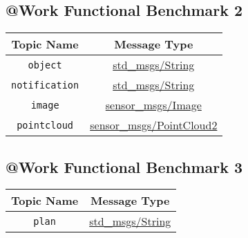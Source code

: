 \documentclass[a4paper]{article}
\begin{document}
\subsection{@Work Functional Benchmark 2}
\begin{center}
\begin{tabular}{|c|c|}\hline
Topic Name & Message Type \\\hline\hline
\verb!object! & \href{http://docs.ros.org/api/std\_msgs/html/msg/String.html}{std\_msgs/String} \\\hline
\verb!notification! & \href{http://docs.ros.org/api/std\_msgs/html/msg/String.html}{std\_msgs/String} \\\hline
\verb!image! & \href{http://docs.ros.org/api/sensor\_msgs/html/msg/Image.html}{sensor\_msgs/Image} \\\hline
\verb!pointcloud! & \href{http://docs.ros.org/api/sensor\_msgs/html/msg/PointCloud2.html}{sensor\_msgs/PointCloud2} \\\hline
\end{tabular}
\end{center}


\subsection{@Work Functional Benchmark 3}
\begin{center}
\begin{tabular}{|c|c|}\hline
Topic Name & Message Type \\\hline\hline
\verb!plan! & \href{http://docs.ros.org/api/std\_msgs/html/msg/String.html}{std\_msgs/String} \\\hline
\end{tabular}
\end{center}
\end{document}
